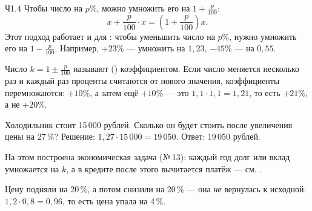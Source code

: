 
\begin{tema}{Ч1.4}
Чтобы  число на $p\%$, можно умножить его на $1+\frac{p}{100}$:
\[
  x+\frac{p}{100}\cdot x=\left(1+\frac{p}{100}\right)x.
\]
Этот подход работает и для : чтобы уменьшить число на $p\%$,
нужно умножить его на $1-\frac{p}{100}$. Например, $+23\%$ — умножить на $1{,}23$,
$-45\%$ — на $0{,}55$.

Число $k=1\pm\frac{p}{100}$ называют  () коэффициентом.
Если число меняется несколько раз и каждый раз проценты считаются от нового значения,
коэффициенты перемножаются: $+10\%$, а затем ещё $+10\%$ — это $1{,}1\cdot1{,}1=1{,}21$,
то есть $+21\%$, а не $+20\%$.

\begin{primer}
Холодильник стоит 15\,000 рублей. Сколько он будет стоить после увеличения
цены на 27\,\%? Решение: $1{,}27\cdot15\,000=19\,050$. Ответ: 19\,050 рублей.
\end{primer}

На этом построена экономическая задача (№\,13): каждый год долг или вклад
умножается на $k$, а в кредите после этого вычитается платёж — см. .

\begin{oshibka}
Цену подняли на 20\,\%, а потом снизили на 20\,\% — она \emph{не} вернулась
к исходной: $1{,}2\cdot0{,}8=0{,}96$, то есть цена упала на 4\,\%.
\end{oshibka}
\end{tema}
